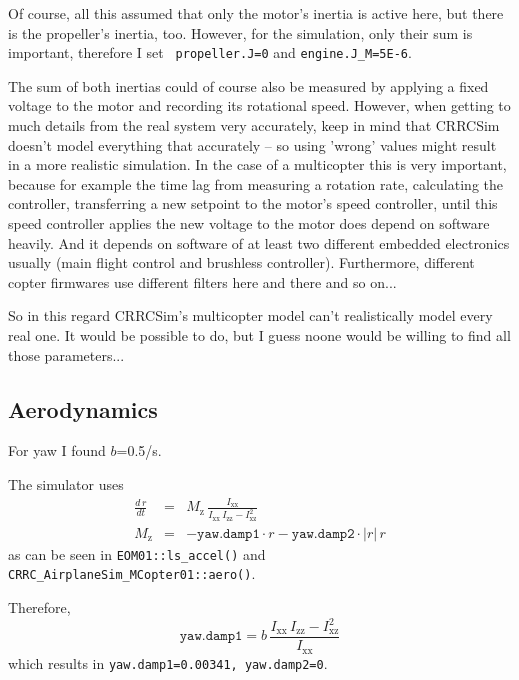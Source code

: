 \documentclass[a4paper, 11pt, pdftex]{article}
\newcommand{\vi}[1]{_{\textrm{#1}}}
\begin{document}
    Of course, all this assumed that only the motor's inertia is active
    here, but there is the propeller's inertia, too. However, for the
    simulation, only their sum is important, therefore I set {\tt
    propeller.J=0}
    and {\tt engine.J\_M=5E-6}.

    The sum of both inertias could of course also be measured by applying a
    fixed voltage to the motor and recording its rotational speed. However,
    when getting to much details from the real system very accurately, keep
    in mind that CRRCSim doesn't model everything that accurately -- so
    using 'wrong' values might result in a more realistic simulation. In the
    case of a multicopter this is very important, because for example the
    time lag from measuring a rotation rate, calculating the controller,
    transferring a new setpoint to the motor's speed controller, until this
    speed controller applies the new voltage to the motor does depend on
    software heavily. And it depends on software of at least two different
    embedded electronics usually (main flight control and brushless
    controller). Furthermore, different copter firmwares use different
    filters here and there and so on...
  
    So in this regard CRRCSim's multicopter model can't realistically model
    every real one. It would be possible to do, but I guess noone would be
    willing to find all those parameters...

  \subsection{Aerodynamics}
  
    For yaw I found $b$=0.5/s.
    
    The simulator uses
    \begin{subequations} 
    \begin{eqnarray}
      \frac{d\,r}{dt} &=& M\vi{z} \, \frac{I\vi{xx}}{I\vi{xx}\,I\vi{zz} - I\vi{xz}^2}\\
      M\vi{z}         &=& - \texttt{yaw.damp1} \cdot r - \texttt{yaw.damp2} \cdot |r| \, r
    \end{eqnarray}
    \end{subequations}
    as can be seen in {\tt EOM01::ls\_accel()} and 
    {\tt CRRC\_AirplaneSim\_MCopter01::aero()}.
    
    Therefore,
    \begin{equation}    
      \texttt{yaw.damp1} = b \, \frac{I\vi{xx}\,I\vi{zz} - I\vi{xz}^2}{I\vi{xx}}
    \end{equation}            
    which results in {\tt yaw.damp1=0.00341, yaw.damp2=0}.
    
\end{document}
